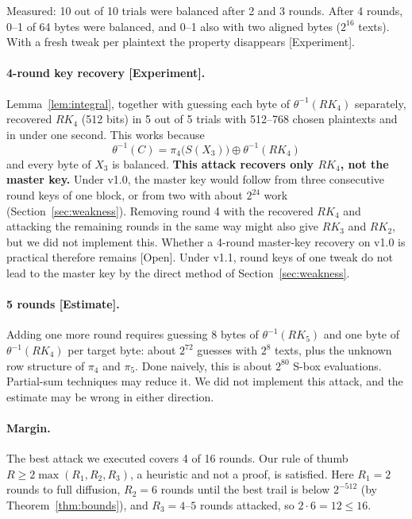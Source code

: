 \documentclass[11pt,a4paper]{article}
\newcommand{\ev}[1]{\textup{\textsf{[#1]}}}
\newcommand{\RK}{\mathit{RK}}
\begin{document}
Measured: 10 out of 10 trials were balanced after 2 and 3 rounds. After 4 rounds, 0--1 of 64 bytes were balanced,
and 0--1 also with two aligned bytes ($2^{16}$ texts). With a fresh tweak per plaintext the property disappears
\ev{Experiment}.

\paragraph{4-round key recovery \ev{Experiment}.} Lemma~\ref{lem:integral}, together with guessing each byte of
$\theta^{-1}(\RK_4)$ separately, recovered $\RK_4$ (512 bits) in 5 out of 5 trials with 512--768 chosen
plaintexts and in under one second. This works because
\[
  \theta^{-1}(C) = \pi_4\bigl(S(X_3)\bigr) \oplus \theta^{-1}(\RK_4)
\]
and every byte of $X_3$ is balanced. \textbf{This attack recovers only $\RK_4$, not the master key.} Under v1.0,
the master key would follow from three consecutive round keys of one block, or from two with about $2^{24}$ work
(Section~\ref{sec:weakness}). Removing round 4 with the recovered $\RK_4$ and attacking the remaining rounds in
the same way might also give $\RK_3$ and $\RK_2$, but we did not implement this. Whether a 4-round master-key
recovery on v1.0 is practical therefore remains \ev{Open}. Under v1.1, round keys of one tweak do not lead to the
master key by the direct method of Section~\ref{sec:weakness}.

\paragraph{5 rounds \ev{Estimate}.} Adding one more round requires guessing 8 bytes of $\theta^{-1}(\RK_5)$ and
one byte of $\theta^{-1}(\RK_4)$ per target byte: about $2^{72}$ guesses with $2^8$ texts, plus the unknown row
structure of $\pi_4$ and $\pi_5$. Done naively, this is about $2^{80}$ S-box evaluations. Partial-sum techniques
may reduce it. We did not implement this attack, and the estimate may be wrong in either direction.

\paragraph{Margin.} The best attack we executed covers 4 of 16 rounds. Our rule of thumb
$R \ge 2\max(R_1, R_2, R_3)$, a heuristic and not a proof, is satisfied. Here $R_1 = 2$ rounds to full diffusion,
$R_2 = 6$ rounds until the best trail is below $2^{-512}$ (by Theorem~\ref{thm:bounds}), and $R_3 = 4$--$5$ rounds
attacked, so $2\cdot 6 = 12 \le 16$.
\end{document}
